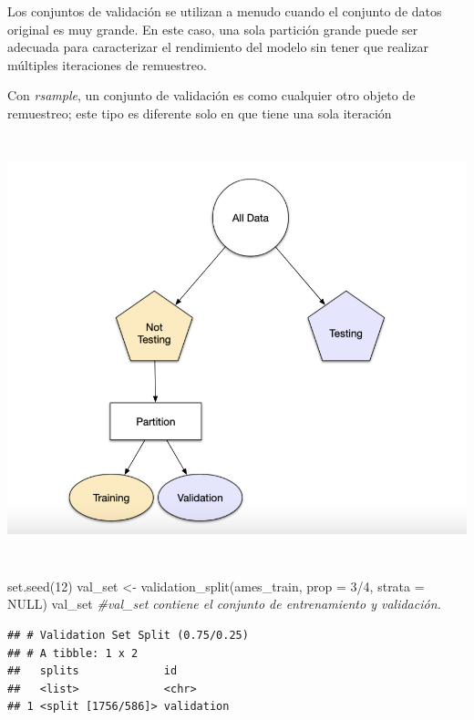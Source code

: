 \documentclass[
]{book}
\newenvironment{Shaded}{\begin{snugshade}}{\end{snugshade}}
\newcommand{\AttributeTok}[1]{\textcolor[rgb]{0.77,0.63,0.00}{#1}}
\newcommand{\CommentTok}[1]{\textcolor[rgb]{0.56,0.35,0.01}{\textit{#1}}}
\newcommand{\ConstantTok}[1]{\textcolor[rgb]{0.00,0.00,0.00}{#1}}
\newcommand{\DecValTok}[1]{\textcolor[rgb]{0.00,0.00,0.81}{#1}}
\newcommand{\FunctionTok}[1]{\textcolor[rgb]{0.00,0.00,0.00}{#1}}
\newcommand{\NormalTok}[1]{#1}
\newcommand{\OtherTok}[1]{\textcolor[rgb]{0.56,0.35,0.01}{#1}}
\newcommand{\SpecialCharTok}[1]{\textcolor[rgb]{0.00,0.00,0.00}{#1}}
\begin{document}
Los conjuntos de validación se utilizan a menudo cuando el conjunto de datos original es muy grande. En este caso, una sola partición grande puede ser adecuada para caracterizar el rendimiento del modelo sin tener que realizar múltiples iteraciones de remuestreo.

Con \emph{rsample}, un conjunto de validación es como cualquier otro objeto de remuestreo; este tipo es diferente solo en que tiene una sola iteración

\begin{center}\includegraphics[width=500pt,height=350pt]{img/04-ml/3-5-3-conjunto-validacion-2} \end{center}

\begin{Shaded}
\begin{Highlighting}[]
\FunctionTok{set.seed}\NormalTok{(}\DecValTok{12}\NormalTok{)}
\NormalTok{val\_set }\OtherTok{\textless{}{-}} \FunctionTok{validation\_split}\NormalTok{(ames\_train, }\AttributeTok{prop =} \DecValTok{3}\SpecialCharTok{/}\DecValTok{4}\NormalTok{, }\AttributeTok{strata =} \ConstantTok{NULL}\NormalTok{)}
\NormalTok{val\_set }\CommentTok{\#val\_set contiene el conjunto de entrenamiento y validación.}
\end{Highlighting}
\end{Shaded}

\begin{verbatim}
## # Validation Set Split (0.75/0.25)  
## # A tibble: 1 x 2
##   splits             id        
##   <list>             <chr>     
## 1 <split [1756/586]> validation
\end{verbatim}
\end{document}
